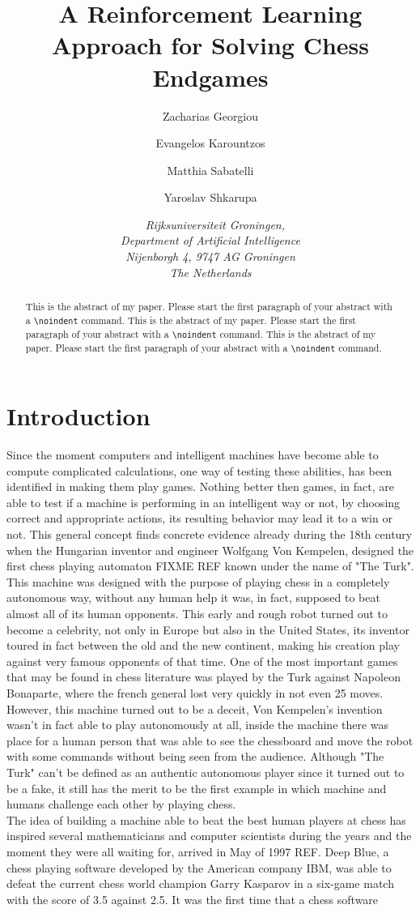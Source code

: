 \documentclass{article}
\title{\textbf{\huge A Reinforcement Learning Approach for Solving Chess Endgames}%
}
\author{Zacharias Georgiou \affila \and
    Evangelos Karountzos \affila \and
    Matthia Sabatelli \affila \and
    Yaroslav Shkarupa \affila}
\date{\affila\ \textit{
Rijksuniversiteit Groningen,\\
Department of Artificial Intelligence\\
  Nijenborgh 4,
  9747 AG Groningen\\
  The Netherlands }\\
 }
\begin{document}
\ttl
\thispagestyle{empty}


\begin{abstract}
\noindent
This is the abstract of my paper. Please start the first paragraph of your abstract with a \verb+\noindent+ command.
This is the abstract of my paper. Please start the first paragraph of your abstract with a \verb+\noindent+ command.
This is the abstract of my paper. Please start the first paragraph of your abstract with a \verb+\noindent+ command.
\end{abstract}


\section{Introduction}

Since the moment computers and intelligent machines have become able to compute complicated calculations, one way of testing these abilities, has been identified in making them play games. Nothing better then games, in fact, are able to test if a machine is performing in an intelligent way or not, by choosing correct and appropriate actions, its resulting behavior may lead it to a win or not. This general concept finds concrete evidence already during the 18th century when the Hungarian inventor and engineer Wolfgang Von Kempelen, designed the first chess playing automaton FIXME REF known under the name of "The Turk". This machine was designed with the purpose of playing chess in a completely autonomous way, without any human help it was, in fact, supposed to beat almost all of its human opponents. This early and rough robot turned out to become a celebrity, not only in Europe but also in the United States, its inventor toured in fact between the old and the new continent, making his creation play against very famous opponents of that time. One of the most important games that may be found in chess literature was played by the Turk against Napoleon Bonaparte, where the french general lost very quickly in not even 25 moves. However, this machine turned out to be a deceit, Von Kempelen's invention wasn't in fact able to play autonomously at all, inside the machine there was place for a human person that was able to see the chessboard and move the robot with some commands without being seen from the audience. Although "The Turk" can't be defined as an authentic autonomous player since it turned out to be a fake, it still has the merit to be the first example in which machine and humans challenge each other by playing chess.\\
The idea of building a machine able to beat the best human players at chess has inspired several mathematicians and computer scientists during the years and the moment they were all waiting for, arrived in May of 1997 REF. Deep Blue, a chess playing software developed by the American company IBM, was able to defeat the current chess world champion Garry Kasparov in a six-game match with the score of 3.5 against 2.5. It was the first time that a chess software  
\end{document}
